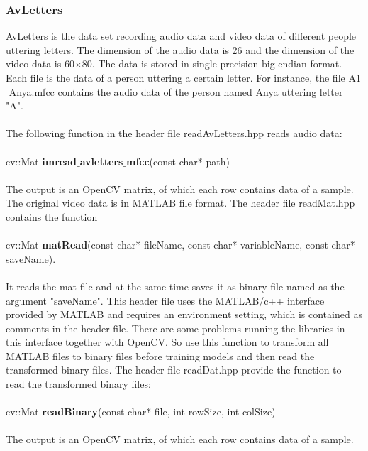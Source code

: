 \documentclass[12pt]{article}
\begin{document}
\subsubsection{AvLetters}
AvLetters is the data set recording audio data and video data of different people uttering letters. The dimension of the audio data is 26 and the dimension of the video data is 60$\times$80. The data is stored in single-precision big-endian format. Each file is the data of a person uttering a certain letter. For instance, the file A1$\_$Anya.mfcc contains the audio data of the person named Anya uttering letter "A". \\
\\
The following function in the header file readAvLetters.hpp reads audio data:\\
\\
cv::Mat \textbf{imread$\_$avletters$\_$mfcc}(const char* path)\\
\\
The output is an OpenCV matrix, of which each row contains data of a sample. The original video data is in MATLAB file format. The header file readMat.hpp contains the function\\
\\
cv::Mat \textbf{matRead}(const char* fileName, const char* variableName, const char* saveName).\\
\\
It reads the mat file and at the same time saves it as binary file named as the argument "saveName". This header file uses the MATLAB/c++ interface provided by MATLAB and requires an environment setting, which is contained as comments in the header file. There are some problems running the libraries in this interface together with OpenCV. So use this function to transform all MATLAB files to binary files before training models and then read the transformed binary files. The header file readDat.hpp provide the function to read the transformed binary files:\\
\\
cv::Mat \textbf{readBinary}(const char* file, int rowSize, int colSize)\\
\\
The output is an OpenCV matrix, of which each row contains data of a sample.
\end{document}
